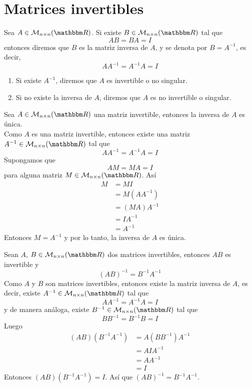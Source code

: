 \section{Matrices invertibles}

\begin{definition}
    Sea $A \in \mathcal{M}_{n \times n}(\RR)$. Si existe $B \in \mathcal{M}_{n \times n}(\RR)$ tal que
    $$AB = BA = I$$
    entonces diremos que $B$ es la matriz inversa de $A$, y se denota por $B = A^{-1}$, es decir,
    $$AA^{-1} = A^{-1}A = I$$
    \begin{enumerate}[label=\roman*)]
        \item Si existe $A^{-1}$, diremos que $A$ es invertible o no singular.
        \item Si no existe la inversa de $A$, diremos que $A$ es no invertible o singular.
    \end{enumerate}
\end{definition}

\newpage

\begin{theorem}
    Sea $A \in \mathcal{M}_{n \times n}(\RR)$ una matriz invertible, entonces la inversa de $A$ es única. \\
    \demostracion Como $A$ es una matriz invertible, entonces existe una matriz $A^{-1} \in \mathcal{M}_{n \times n}(\RR)$ tal que
    $$AA^{-1} = A^{-1}A = I$$
    Supongamos que
    $$AM = MA = I$$
    para alguna matriz $M \in \mathcal{M}_{n \times n}(\RR)$. Así
    \begin{align*}
        M & = MI \\
        & = M(AA^{-1}) \\
        & = (MA) A^{-1} \\
        & = IA^{-1} \\
        & = A^{-1}
    \end{align*}
    Entonces $M = A^{-1}$ y por lo tanto, la inversa de $A$ es única.
\end{theorem}

\begin{theorem}
    Sean $A$, $B \in \mathcal{M}_{n \times n}(\RR)$ dos matrices invertibles, entonces $AB$ es invertible y
    $$(AB)^{-1} = B^{-1}A^{-1}$$
    \demostracion Como $A$ y $B$ son matrices invertibles, entonces existe la matriz inversa de $A$, es decir, existe $A^{-1} \in \mathcal{M}_{n \times n}(\RR)$ tal que
    $$AA^{-1} = A^{-1}A = I$$
    y de manera análoga, existe $B^{-1} \in \mathcal{M}_{n \times n}(\RR)$ tal que
    $$BB^{-1} = B^{-1}B = I$$
    Luego
    \begin{align*}
        (AB)(B^{-1}A^{-1}) & = A(BB^{-1})A^{-1} \\
        & = AIA^{-1} \\
        & = AA^{-1} \\
        & = I
    \end{align*}
    Entonces $(AB)(B^{-1}A^{-1}) = I$. Así que $(AB)^{-1} = B^{-1}A^{-1}$.
\end{theorem}

